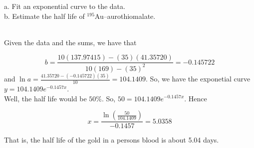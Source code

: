 a. Fit an exponential curve to the data.\\

b. Estimate the half life of $^{195}$Au--aurothiomalate.\\

\begin{solution}\renewcommand{\qedsymbol}{}\ \\
    Given the data and the sums, we have that
    
    $$b=\frac{10(137.97415)-(35)(41.35720)}{10(169)-(35)^2}=-0.145722$$
    and $\ln a=\frac{41.35720-(-0.145722)(35)}{10}=104.1409$. So, we have the exponetial curve
    $y=104.1409e^{-0.1457x}$.\\
    Well, the half life would be $50\%$. So, $50=104.1409e^{-0.1457x}$. Hence
    
    $$x=\frac{\ln(\frac{50}{104.1409})}{-0.1457}=5.0358$$
    
    That is, the half life of the gold in a persons blood is about 5.04 days.

\end{solution}